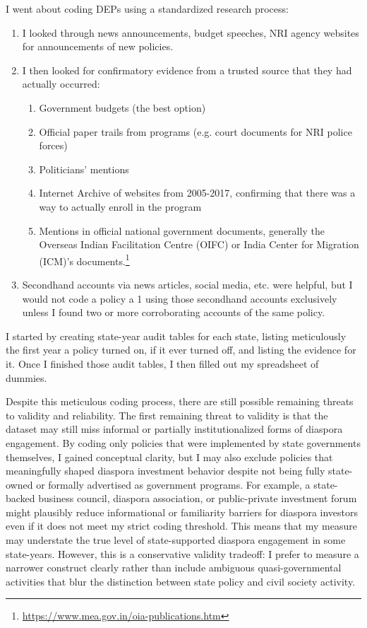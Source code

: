 \documentclass[12pt]{article}
\begin{document}
            I went about coding DEPs using a standardized research process:
            \begin{enumerate}
                \item I looked through news announcements, budget speeches, NRI agency websites for announcements of new policies.
                \item I then looked for confirmatory evidence from a trusted source that they had actually occurred:
                \begin{enumerate}
                    \item Government budgets (the best option)
                    \item Official paper trails from programs (e.g. court documents for NRI police forces)
                    \item Politicians' mentions
                    \item Internet Archive of websites from 2005-2017, confirming that there was a way to actually enroll in the program
                    \item Mentions in official national government documents, generally the Overseas Indian Facilitation Centre (OIFC) or India Center for Migration (ICM)'s documents.\footnote{\url{https://www.mea.gov.in/oia-publications.htm}}
                \end{enumerate}
            \item Secondhand accounts via news articles, social media, etc. were helpful, but I would not code a policy a 1 using those secondhand accounts exclusively unless I found two or more corroborating accounts of the same policy.
            \end{enumerate}

I started by creating state-year audit tables for each state, listing meticulously the first year a policy turned on, if it ever turned off, and listing the evidence for it. Once I finished those audit tables, I then filled out my spreadsheet of dummies.

Despite this meticulous coding process, there are still possible remaining threats to validity and reliability. The first remaining threat to validity is that the dataset may still miss informal or partially institutionalized forms of diaspora engagement. By coding only policies that were implemented by state governments themselves, I gained conceptual clarity, but I may also exclude policies that meaningfully shaped diaspora investment behavior despite not being fully state-owned or formally advertised as government programs. For example, a state-backed business council, diaspora association, or public-private investment forum might plausibly reduce informational or familiarity barriers for diaspora investors even if it does not meet my strict coding threshold. This means that my measure may understate the true level of state-supported diaspora engagement in some state-years. However, this is a conservative validity tradeoff: I prefer to measure a narrower construct clearly rather than include ambiguous quasi-governmental activities that blur the distinction between state policy and civil society activity.
\end{document}
